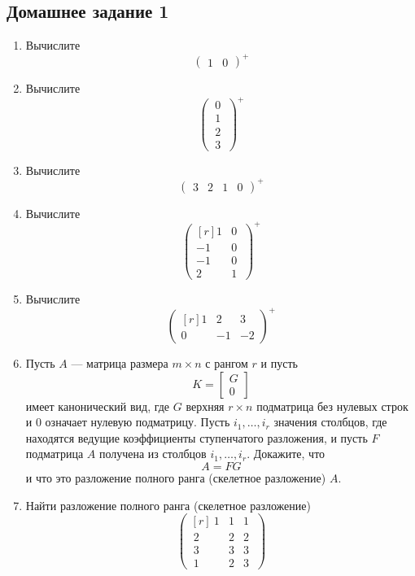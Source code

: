 \subsection{Домашнее задание 1}\begin{enumerate}
    \item Вычислите \[\begin{pmatrix} 1&0\end{pmatrix}^+\]
    \item Вычислите \[\begin{pmatrix} ~0~\\~1~\\~2~\\~3~\end{pmatrix}^+\]
    \item Вычислите \[\begin{pmatrix} 3&2&1&0 \end{pmatrix}^+\]
    \item Вычислите \[\begin{pmatrix}[r] 1&0~\\-1 & 0~\\-1 & 0~\\ 2&1~\end{pmatrix}^+\]
    \item Вычислите  \[\begin{pmatrix}[r] 1&2&3\\0 & -1 & -2\end{pmatrix}^+\]
    \item Пусть $A $ --- матрица размера $m\times n$
    с рангом $r$ и пусть
    $$
    K = \left[ \begin{array}{c} G \\ \hline  0\end{array} \right]
    $$
    имеет канонический вид,
    где $G$ верхняя $r\times n$ подматрица без нулевых строк и
    $0$ означает нулевую подматрицу. Пусть $i_1, \dots ,i_r$ значения столбцов, где находятся ведущие коэффициенты ступенчатого разложения, и пусть $F$ подматрица $A$ получена из столбцов $i_1,
    \dots , i_r$.  Докажите, что
    $$
    A = FG
    $$
    и что это разложение полного ранга (скелетное разложение) $A$.
    \item Найти разложение полного ранга (скелетное разложение)
    \[\begin{pmatrix}[r] ~1&1&1~\\~2 & 2 & 2~\\~3 & 3 & 3~\\ ~1&2&3~\end{pmatrix}\]

\end{enumerate}
